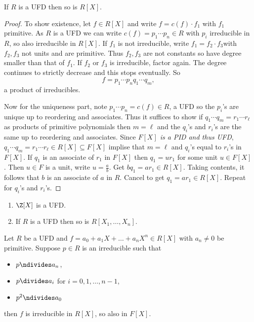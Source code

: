 \documentclass[a4paper]{article}
\theoremstyle{definition}
\begin{document}
\begin{theorem}
  If \(R\) is a UFD then so is \(R[X]\).
\end{theorem}

\begin{proof}
  To show existence, let \(f \in R[X]\) and write \(f = c(f) \cdot f_1\) with \(f_1\) primitive. As \(R\) is a UFD we can write \(c(f) = p_1 \cdots p_n \in R\) with \(p_i\) irreducible in \(R\), so also irreducible in \(R[X]\). If \(f_1\) is not irreducible, write \(f_1 = f_2 \cdot f_3\)with \(f_2, f_3\) not units and are primitive. Thus \(f_2, f_3\) are not constants so have degree smaller than that of \(f_1\). If \(f_2\) or \(f_3\) is irreducible, factor again. The degree continues to strictly decrease and this stops eventually. So
  \[
    f = p_1 \cdots p_n q_1 \cdots q_m,
  \]
  a product of irreducibles.

  Now for the uniqueness part, note \(p_1 \cdots p_n = c(f) \in R\), a UFD so the \(p_i\)'s are unique up to reordering and associates. Thus it suffices to show if \(q_1 \cdots q_m = r_1 \cdots r_\ell\) as products of primitive polynomials then \(m = \ell\) and the \(q_i\)'s and \(r_i\)'s are the same up to reordering and associates. Since \emph{\(F[X]\) is a PID and thus UFD}, \(q_1 \cdots q_m = r_1 \cdots r_\ell \in R[X] \subseteq F[X]\) implise that \(m = \ell\) and \(q_i\)'s equal to \(r_i\)'s in \(F[X]\). If \(q_1\) is an associate of \(r_1\) in \(F[X]\) then \(q_1 = ur_1\) for some unit \(u \in F[X]\). Then \(u \in F\) is a unit, write \(u = \frac{a}{b}\). Get \(bq_1 = ar_1 \in R[X]\). Taking contents, it follows that \(b\) is an associate of \(a\) in \(R\). Cancel to get \(q_1 = ar_1 \in R[X]\). Repeat for \(q_i\)'s and \(r_i\)'s.
\end{proof}

\begin{eg}\leavevmode
  \begin{enumerate}
  \item \(\Z[X]\) is a UFD.
  \item If \(R\) is a UFD then so is \(R[X_1, \dots, X_n]\).
  \end{enumerate}
\end{eg}

\begin{proposition}
  Let \(R\) be a UFD and \(f = a_0 + a_1X + \dots + a_nX^n \in R[X]\) with \(a_n \neq 0\) be primitive. Suppose \(p \in R\) is an irreducible such that
  \begin{itemize}
  \item \(p \ndivides a_n\),
  \item \(p \divides a_i\) for \(i = 0, 1, \dots, n - 1\),
  \item \(p^2 \ndivides a_0\)
  \end{itemize}
  then \(f\) is irreducible in \(R[X]\), so also in \(F[X]\).
\end{proposition}
\end{document}
